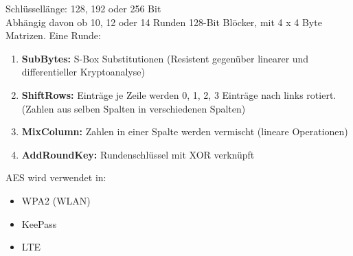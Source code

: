 Schlüssellänge: 128, 192 oder 256 Bit \\
Abhängig davon ob 10, 12 oder 14 Runden 128-Bit Blöcker, mit 4 x 4 Byte Matrizen. Eine Runde:
\begin{enumerate}
	\item \textbf{SubBytes:} S-Box Substitutionen (Resistent gegenüber linearer und differentieller Kryptoanalyse)
	\item \textbf{ShiftRows:} Einträge je Zeile werden 0, 1, 2, 3 Einträge nach links rotiert. (Zahlen aus selben Spalten in verschiedenen Spalten)
	\item \textbf{MixColumn:} Zahlen in einer Spalte werden vermischt (lineare Operationen)
	\item \textbf{AddRoundKey:} Rundenschlüssel mit XOR verknüpft
\end{enumerate}

AES wird verwendet in:
\begin{itemize}
	\item WPA2 (WLAN)
	\item KeePass
	\item LTE
\end{itemize}